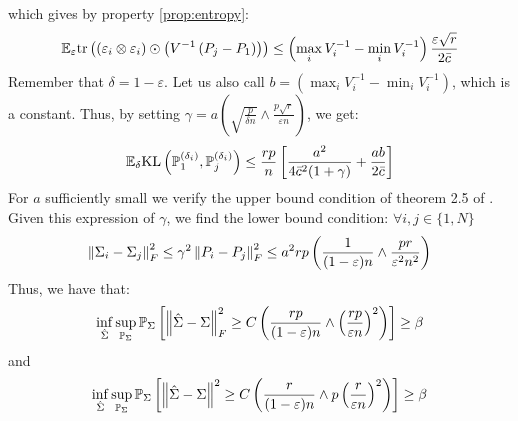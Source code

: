 \documentclass{article}
\numberwithin{equation}{section}
\numberwithin{equation}{section}
\begin{document}
            which gives by property \ref{prop:entropy}:
            \begin{equation}
                \begin{split}
                \mathbb{E}_\varepsilon \text{tr}\left((\varepsilon_i \otimes \varepsilon_i) \odot \left(V^{-1}\left(P_j - P_1\right)\right)\right) \leq \left(\max_i{V^{-1}_i} - \min_i{V^{-1}_i} \right) \frac{\varepsilon \sqrt{r}}{2 \bar{c}}
                \end{split}
            \end{equation}
            Remember that $\delta = 1 - \varepsilon$. Let us also call $b=\left(\max_i{V^{-1}_i} - \min_i{V^{-1}_i} \right)$, which is a constant. Thus, by setting $\gamma = a \left(\sqrt{\frac{p}{\delta n}} \land \frac{p\sqrt{r}}{\varepsilon n}\right)$, we get:
            \begin{equation}
                \begin{split}
                \mathbb{E}_\delta \text{KL}\left(\mathbb{P}_1^{(\delta_i)}, \mathbb{P}_j^{(\delta_i)} \right) \leq \frac{rp}{n}\left[ \frac{a^2}{4\bar{c}^2(1+\gamma)} + \frac{ab}{2 \bar{c}} \right]
                \end{split}
            \end{equation}
            For $a$ sufficiently small we verify the upper bound condition of theorem 2.5 of \cite{tsybakovNonparametricEstimators2009}. Given this expression of $\gamma$, we find the lower bound condition: $\forall i, j \in \lbrace 1, N \rbrace$
            \begin{equation}
                \begin{split}
                \left\Vert \Sigma_i - \Sigma_j \right\Vert_F^2 \leq \gamma^2 \left\Vert P_i - P_j \right\Vert_F^2 \leq a^2 r p \left( \frac{1}{ (1-\varepsilon)n} \land \frac{pr}{\varepsilon^2 n^2}\right)
                \end{split}
            \end{equation}
            Thus, we have that:
            \begin{equation}
                \begin{split}
                \inf_{\hat{\Sigma}} \sup_{\mathbb{P}_\Sigma} \mathbb{P}_\Sigma \left[ \left\Vert \hat{\Sigma} - \Sigma \right\Vert_F^2 \geq C \left( \frac{rp}{(1-\varepsilon) n} \land \left(\frac{rp}{\varepsilon n}\right)^2\right) \right] \geq \beta
                \end{split}
            \end{equation}
            and 
            \begin{equation}
                \begin{split}
                \inf_{\hat{\Sigma}} \sup_{\mathbb{P}_\Sigma} \mathbb{P}_\Sigma \left[ \left\Vert \hat{\Sigma} - \Sigma \right\Vert^2 \geq C \left( \frac{r}{(1-\varepsilon) n} \land p \left(\frac{r}{\varepsilon n}\right)^2\right) \right] \geq \beta
                \end{split}
            \end{equation}
            
\end{document}
